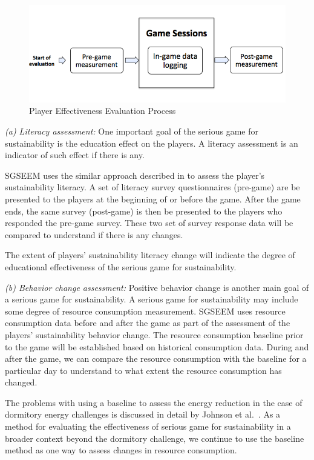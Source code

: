 \documentclass{sigchi}
\begin{document}
\begin{figure}
  \center
  \includegraphics[width=\columnwidth]{pre-post-eval}
  \caption{Player Effectiveness Evaluation Process}
  \label{fig:pre-post-eval}
\end{figure}

\emph {(a) Literacy assessment:} One important goal of the serious
game for sustainability is the education effect on the
players. A literacy assessment is an indicator of such effect if there
is any.

SGSEEM uses the similar approach described in \cite{csdl2-10-08} to
assess the player's sustainability literacy. A set of literacy survey
questionnaires (pre-game) are be presented to the players at the
beginning of or before the game. After the game ends, the same survey
(post-game) is then be presented to the players who responded the
pre-game survey. These two set of survey response data will be
compared to understand if there is any changes.

The extent of players' sustainability literacy change will indicate
the degree of educational effectiveness of the serious game for
sustainability.

\emph {(b) Behavior change assessment:} Positive behavior change is
another main goal of a serious game for sustainability. A serious game
for sustainability may include some degree of resource
consumption measurement. SGSEEM uses resource consumption data before and
after the game as part of the assessment of the
players' sustainability behavior change.  The resource consumption
baseline prior to the game will be established based on historical
consumption data. During and after the game, we can compare the
resource consumption with the baseline for a particular day to
understand to what extent the resource consumption has changed.

The problems with using a baseline to assess the energy reduction in
the case of dormitory energy challenges is discussed in detail by Johnson et al.~\cite{csdl2-12-08}. As a method for evaluating the
effectiveness of serious game for sustainability in a broader context
beyond the dormitory challenge, we continue to use the baseline
method as one way to assess changes in resource consumption.
\end{document}
